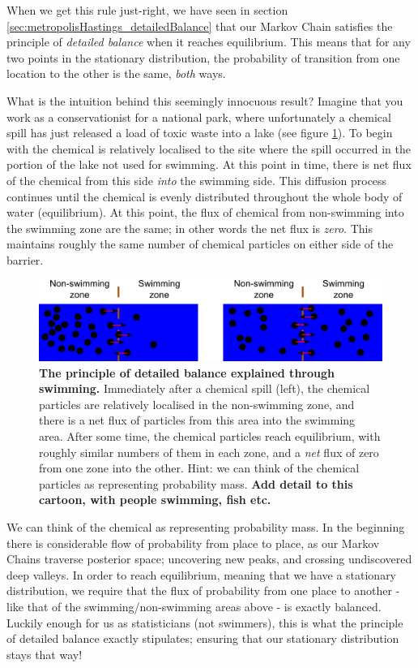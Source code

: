 \documentclass[11pt,fullpage]{book}
\begin{document}
When we get this rule just-right, we have seen in section \ref{sec:metropolisHastings_detailedBalance} that our Markov Chain satisfies the principle of \textit{detailed balance} when it reaches equilibrium. This means that for any two points in the stationary distribution, the probability of transition from one location to the other is the same, \textit{both} ways. 

What is the intuition behind this seemingly innocuous result? Imagine that you work as a conservationist for a national park, where unfortunately a chemical spill has just released a load of toxic waste into a lake (see figure \ref{fig:metropolisHastings_swimmingDetailedBalance}). To begin with the chemical is relatively localised to the site where the spill occurred in the portion of the lake not used for swimming. At this point in time, there is net flux of the chemical from this side \textit{into} the swimming side. This diffusion process continues until the chemical is evenly distributed throughout the whole body of water (equilibrium). At this point, the flux of chemical from non-swimming into the swimming zone are the same; in other words the net flux is \textit{zero}. This maintains roughly the same number of chemical particles on either side of the barrier.

\begin{figure}
\centerline{\includegraphics[width=1.0\textwidth]{metropolisHastings_swimmingDetailedBalance.pdf}}
\caption{\textbf{The principle of detailed balance explained through swimming.} Immediately after a chemical spill (left), the chemical particles are relatively localised in the non-swimming zone, and there is a net flux of particles from this area into the swimming area. After some time, the chemical particles reach equilibrium, with roughly similar numbers of them in each zone, and a \textit{net} flux of zero from one zone into the other. Hint: we can think of the chemical particles as representing probability mass. \textbf{Add detail to this cartoon, with people swimming, fish etc.}}\label{fig:metropolisHastings_swimmingDetailedBalance}
\end{figure}

We can think of the chemical as representing probability mass. In the beginning there is considerable flow of probability from place to place, as our Markov Chains traverse posterior space; uncovering new peaks, and crossing undiscovered deep valleys. In order to reach equilibrium, meaning that we have a stationary distribution, we require that the flux of probability from one place to another - like that of the swimming/non-swimming areas above - is exactly balanced. Luckily enough for us as statisticians (not swimmers), this is what the principle of detailed balance exactly stipulates; ensuring that our stationary distribution stays that way!
\end{document}

